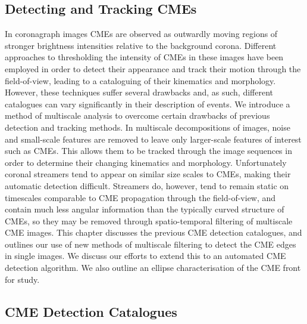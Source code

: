 \documentclass[namedreferences]{SolarPhysics}
\begin{document}
\begin{article}
\section{Detecting and Tracking CMEs}


In coronagraph images CMEs are observed as outwardly moving regions of stronger brightness intensities relative to the background corona. Different approaches to thresholding the intensity of CMEs in these images have been employed in order to detect their appearance and track their motion through the field-of-view, leading to a cataloguing of their kinematics and morphology. However, these techniques suffer several drawbacks and, as such, different catalogues can vary significantly in their description of events. We introduce a method of multiscale analysis to overcome certain drawbacks of previous detection and tracking methods. In multiscale decompositions of images, noise and small-scale features are removed to leave only larger-scale features of interest such as CMEs. This allows them to be tracked through the image sequences in order to determine their changing kinematics and morphology. Unfortunately coronal streamers tend to appear on similar size scales to CMEs, making their automatic detection difficult. Streamers do, however, tend to remain static on timescales comparable to CME propagation through the field-of-view, and contain much less angular information than the typically curved structure of CMEs, so they may be removed through spatio-temporal filtering of multiscale CME images. This chapter discusses the previous CME detection catalogues, and outlines our use of new methods of multiscale filtering to detect the CME edges in single images. We discuss our efforts to extend this to an automated CME detection algorithm. We also outline an ellipse characterisation of the CME front for study.

\subsection{CME Detection Catalogues}
\label{sect:cmecatalogues}


\end{article}
\end{document}

